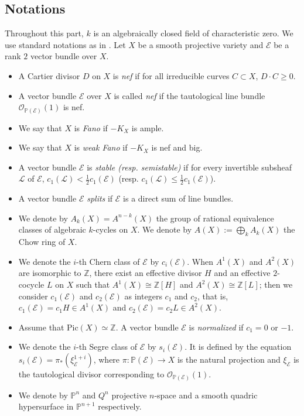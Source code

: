 \documentclass{amsproc}
\theoremstyle{definition}
\def\P{{\mathbb P}}
\def\Z{{\mathbb Z}}
\def\cE{{\mathcal E}}
\def\cL{{\mathcal L}}
\def\cO{{\mathcal{O}}}
\begin{document}
\subsection*{Notations}Throughout this part, $k$ is an algebraically closed field of characteristic zero. We use standard notations as in \cite{H77, L041, L042, OSS80}. Let $X$ be a smooth projective variety and $\cE$ be a rank $2$ vector bundle over $X$. 
\begin{itemize}
\item A Cartier divisor $D$ on $X$ is {\it nef} if for all irreducible curves $C\subset X$, $D\cdot C\ge 0$.
\item A vector bundle $\cE$ over $X$ is called {\it nef} if the tautological line bundle  $\cO_{\P(\cE)}(1)$ is nef.
\item We say that $X$ is {\it Fano} if $-K_X$ is ample. 
\item We say that $X$ is {\it weak Fano} if $-K_X$ is nef and big.  
\item A vector bundle $\cE$ is {\it stable (resp. semistable)} if for every invertible subsheaf $\cL$ of $\cE$, $c_1(\cL)<\frac{1}{2}c_1(\cE)$ (resp. $c_1(\cL)\le \frac{1}{2}c_1(\cE)$).
\item A vector bundle $\cE$ {\it splits} if $\cE$ is a direct sum of line bundles. 
\item We denote by $A_k(X)=A^{n-k}(X)$ the group of rational equivalence classes of algebraic $k$-cycles on $X$. We denote by  $A(X):=\bigoplus_k A_k(X)$ the Chow ring of $X$.
\item We denote the $i$-th Chern class of $\cE$ by $c_i(\cE)$. When $A^1(X)$ and $ A^2(X)$ are isomorphic to $\Z$, there exist an effective divisor $H$ and an effective $2$-cocycle $L$ on $X$ such that $A^1(X)\cong \Z[H]$ and $A^2(X)\cong \Z[L]$; then we consider $c_1(\cE)$ and $c_2(\cE)$ as integers $c_1$ and $c_2$, that is, $c_1(\cE)=c_1H\in A^1(X)$ and $c_2(\cE)=c_2L\in A^2(X)$.
\item Assume that Pic$(X)\simeq \Z$. A vector bundle $\cE$ is {\it normalized} if $c_1=0$ or $-1$.
\item We denote the $i$-th Segre class of $\cE$ by $s_i(\cE)$. It is defined by the equation $s_i(\cE)=\pi_{*}(\xi_{\cE}^{1+i})$, where $\pi:\P(\cE)\rightarrow X$ is the natural projection and $\xi_{\cE}$ is the tautological divisor corresponding to $\cO_{\P(\cE)}(1)$. 
\item We denote by $\P^n$ and $Q^n$ projective $n$-space and a smooth quadric hypersurface in $\P^{n+1}$ respectively.
\end{itemize}
\end{document}

